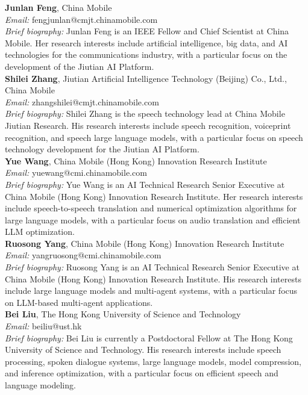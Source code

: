 \documentclass[a4paper]{article}
\begin{document}
\noindent\textbf{Junlan Feng}, China Mobile\\
\textit{Email:} fengjunlan@cmjt.chinamobile.com\\
\textit{Brief biography:} Junlan Feng is an IEEE Fellow and Chief Scientist at China Mobile. Her research interests include artificial intelligence, big data, and AI technologies for the communications industry, with a particular focus on the development of the Jiutian AI Platform.\\

\noindent\textbf{Shilei Zhang}, Jiutian Artificial Intelligence Technology (Beijing) Co., Ltd., China Mobile\\
\textit{Email:} zhangshilei@cmjt.chinamobile.com\\
\textit{Brief biography:} Shilei Zhang is the speech technology lead at China Mobile Jiutian Research. His research interests include speech recognition, voiceprint recognition, and speech large language models, with a particular focus on speech technology development for the Jiutian AI Platform.\\

\noindent\textbf{Yue Wang}, China Mobile (Hong Kong) Innovation Research Institute\\
\textit{Email:} yuewang@cmi.chinamobile.com \\
\textit{Brief biography:} Yue Wang is an AI Technical Research Senior Executive at China Mobile (Hong Kong) Innovation Research Institute. Her research interests include speech-to-speech translation and numerical optimization algorithms for large language models, with a particular focus on audio translation and efficient LLM optimization.\\

\noindent\textbf{Ruosong Yang}, China Mobile (Hong Kong) Innovation Research Institute\\
\textit{Email:} yangruosong@cmi.chinamobile.com\\
\textit{Brief biography:} Ruosong Yang is an AI Technical Research Senior Executive at China Mobile (Hong Kong) Innovation Research Institute. His research interests include large language models and multi-agent systems, with a particular focus on LLM-based multi-agent applications.\\

\noindent\textbf{Bei Liu}, The Hong Kong University of Science and Technology\\
\textit{Email:} beiliu@ust.hk\\
\textit{Brief biography:} Bei Liu is currently a Postdoctoral Fellow at The Hong Kong University of Science and Technology. His research interests include speech processing, spoken dialogue systems, large language models, model compression, and inference optimization, with a particular focus on efficient speech and language modeling.\\
\end{document}
